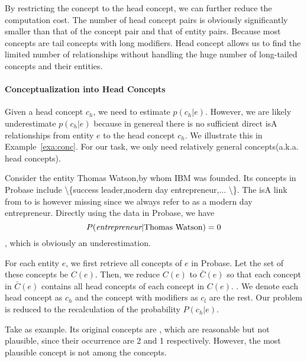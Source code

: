 By restricting the concept to the head concept, we can further reduce the computation cost.
The number of head concept pairs is obviously significantly smaller than that of the concept pair and that of entity pairs. Because most concepts are tail concepts with long modifiers. Head concept allows us to find the limited number of relationships without handling the huge number of long-tailed concepts and their entities.

\paragraph{Conceptualization into Head Concepts}

Given a head concept $c_h$, we need to estimate $p(c_h|e)$. However, we are likely underestimate $p(c_h|e)$ because in genereal there is no sufficient direct isA relationships from entity $e$ to the head concept $c_h$. We illustrate this in Example~\ref{exa:conc}. For our task, we only need relatively general concepts(a.k.a. head concepts).
\begin{example}
\label{exa:conc}
Consider the entity \ac{Thomas Watson},by whom \ac{IBM} was founded. Its concepts in Probase include \ac{\{success leader,modern day entrepreneur,... \}}. The isA link from  to  is however missing since we always refer to  as a modern day entrepreneur. Directly using the data in Probase, we have $$P(\emph{entrepreneur}|{\tt \text{Thomas Watson}})=0$$, which is obviously an underestimation.
\end{example}


For each entity $e$, we first retrieve all concepts of $e$ in Probase. Let the set of these concepts be $C(e)$. Then, we reduce $C(e)$ to $\bar{C}(e)$ so that each concept in $\bar{C}(e)$ contains all head concepts of each concept in $C(e)$. . We denote each head concept as $c_h$ and the concept with modifiers as $c_{l}$ are the rest. Our problem is reduced to the recalculation of the probability $P({c_h}|e)$.



\begin{example}
\label{exa:HvsO}
Take  as example. Its original concepts are , which are reasonable but not plausible, since their occurrence are 2 and 1 respectively. However, the most plausible concept  is not among the concepts.
\end{example}

